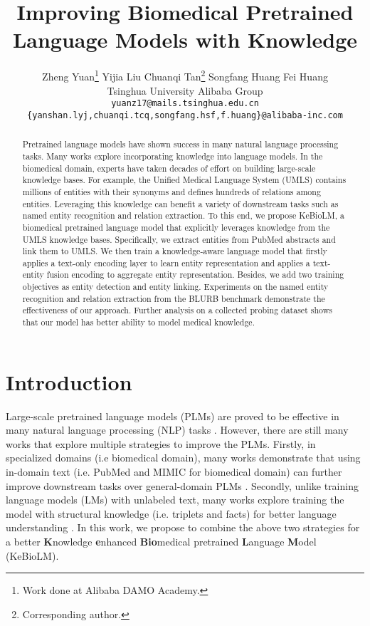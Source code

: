 \documentclass[11pt]{article}
\title{Improving Biomedical Pretrained Language Models with Knowledge}
\author{
Zheng Yuan\thanks{Work done at Alibaba DAMO Academy.} \space\space\space
Yijia Liu \space\space
Chuanqi Tan\thanks{Corresponding author.} \space\space\space
Songfang Huang \space\space
Fei Huang\\
Tsinghua University \space\space\space\space
Alibaba Group\\
\texttt{yuanz17@mails.tsinghua.edu.cn}\\
\texttt{\{yanshan.lyj,chuanqi.tcq,songfang.hsf,f.huang\}@alibaba-inc.com}
}
\begin{document}
\maketitle
\begin{abstract}



Pretrained language models have shown success in many natural language processing tasks.
Many works explore incorporating knowledge into language models.
In the biomedical domain, experts have taken decades of effort on building large-scale knowledge bases.
For example, the Unified Medical Language System (UMLS) contains millions of entities with their synonyms and defines hundreds of relations among entities.
Leveraging this knowledge can benefit a variety of downstream tasks such as named entity recognition and relation extraction.
To this end, we propose KeBioLM, a biomedical pretrained language model that explicitly leverages knowledge from the UMLS knowledge bases.
Specifically, we extract entities from PubMed abstracts and link them to UMLS.
We then train a knowledge-aware language model that firstly applies a text-only encoding layer to learn entity representation and applies a text-entity fusion encoding to aggregate entity representation. Besides, we add two training objectives as entity detection and entity linking.
Experiments on the named entity recognition and relation extraction from the BLURB benchmark demonstrate the effectiveness of our approach. Further analysis on a collected probing dataset shows that our model has better ability to model medical knowledge.

\end{abstract}

\section{Introduction}
Large-scale pretrained language models (PLMs) are proved to be effective in many natural language processing (NLP) tasks \cite{peters-etal-2018-deep,devlin-etal-2019-bert}.
However, there are still many works that explore multiple strategies to improve the PLMs. Firstly, in specialized domains (i.e biomedical domain), many works demonstrate that using in-domain text (i.e. PubMed and MIMIC for biomedical domain) can further improve downstream tasks over general-domain PLMs \cite{lee2020biobert, peng-etal-2019-transfer, gu2020domain, shin-etal-2020-biomegatron, lewis-etal-2020-pretrained, beltagy-etal-2019-scibert, alsentzer-etal-2019-publicly}.
Secondly, unlike training language models (LMs) with unlabeled text, many works explore training the model with structural knowledge (i.e. triplets and facts) for better language understanding \cite{zhang-etal-2019-ernie,peters-etal-2019-knowledge,fevry-etal-2020-entities,wang2019kepler}. In this work, we propose to combine the above two strategies for a better \textbf{K}nowledge \textbf{e}nhanced \textbf{Bio}medical pretrained \textbf{L}anguage \textbf{M}odel (KeBioLM). 
\end{document}
